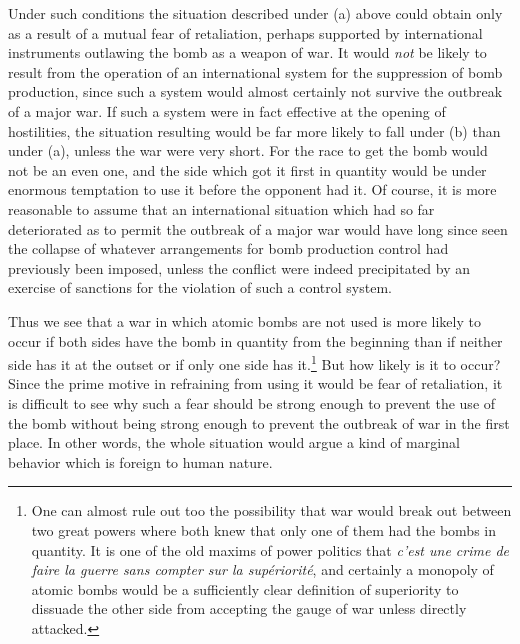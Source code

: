Under such conditions the situation described under (a) above could obtain only as a result of a mutual fear of retaliation, perhaps supported by international instruments outlawing the bomb as a weapon of war. It would \emph{not} be likely to result from the operation of an international system for the suppression of bomb production, since such a system would almost certainly not survive the outbreak of a major war. If such a system were in fact effective at the opening of hostilities, the situation resulting would be far more likely to fall under (b) than under (a), unless the war were very short. For the race to get the bomb would not be an even one, and the side which got it first in quantity would be under enormous temptation to use it before the opponent had it. Of course, it is more reasonable to assume that an international situation which had so far deteriorated as to permit the outbreak of a major war would have long since seen the collapse of whatever arrangements for bomb production control had previously been imposed, unless the conflict were indeed precipitated by an exercise of sanctions for the violation of such a control system.

Thus we see that a war in which atomic bombs are not used is more likely to occur if both sides have the bomb in quantity from the beginning than if neither side has it at the outset or if only one side has it.\footnote{One can almost rule out too the possibility that war would break out between two great powers where both knew that only one of them had the bombs in quantity. It is one of the old maxims of power politics that \emph{c'est une crime de faire la guerre sans compter sur la sup\'eriorit\'e}, and certainly a monopoly of atomic bombs would be a sufficiently clear definition of superiority to dissuade the other side from accepting the gauge of war unless directly attacked.} But how likely is it to occur? Since the prime motive in refraining from using it would be fear of retaliation, it is difficult to see why such a fear should be strong enough to prevent the use of the bomb without being strong enough to prevent the outbreak of war in the first place. In other words, the whole situation would argue a kind of marginal behavior which is foreign to human nature.

